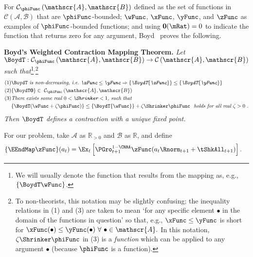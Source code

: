 \documentclass[BufferStockTheory]{subfiles}
\begin{document}
For $\mathcal{C}_{\phiFunc }\left( \mathscr{A},\mathscr{B}\right) $
defined as the set of functions in
$\mathcal{C}(\mathscr{A},\mathscr{B})$ that are $\phiFunc$-bounded;
$\wFunc$, $\xFunc$, $\yFunc$, and $\zFunc$ as examples of
$\phiFunc$-bounded functions; and using $\mathbf{0}(\mRat)=0$ to
indicate the function that returns zero for any argument,
Boyd~\citeyearpar{jboydWeighted} proves the following.

\textbf{Boyd's Weighted Contraction Mapping Theorem.} \textit{Let $\BoydT:\mathcal{C}_{\phiFunc }\left( \mathscr{A},\mathscr{B}\right)
  \rightarrow \mathcal{C}\left( \mathscr{A},\mathscr{B}\right) $ such
  that}\footnote{We will usually denote the function that results from the mapping as, e.g., $\{\BoydT\wFunc\}$.}$^,$\footnote{To non-theorists, this notation may be slightly confusing; the inequality relations in (1) and (3) are taken to mean `for any specific element $\bullet$ in the domain of the functions in question' so that, e.g., $\xFunc \leq \yFunc$ is short for $\xFunc(\bullet) \leq \yFunc(\bullet)~\forall~\bullet\in \mathscr{A}.$  In this notation, $\zeta \Shrinker \phiFunc$ in (3) is a {\it function} which can be applied to any argument $\bullet$ (because $\phiFunc$ is a function).} \nopagebreak
\begin{align*}
  \mbox{(1)} &\BoydT%
               \mbox{ {\it is non-decreasing, i.e.\ ${\xFunc} \leq {\yFunc}\Rightarrow
               \{\BoydT{\xFunc}\} \leq \{\BoydT{\yFunc}\}$}}   \nonumber \\
  \mbox{(2)} & \{\BoydT\mathbf{0}\}\in ~ \mathcal{C}_{\phiFunc }\left(\mathscr{A},\mathscr{B}\right)  \notag \\
  \mbox{(3)}
             & \mbox{\it There exists some real $0 < \Shrinker < 1$, such that} \\
             & \{\BoydT({\wFunc} +\zeta\phiFunc )\} \leq \{\BoydT{\wFunc}\} +\zeta\Shrinker \phiFunc
               \mbox{ {\it ~holds for all real $\zeta > 0$} }.
\end{align*}%
\textit{Then $\BoydT$ defines a contraction with a unique fixed point.}

For our problem, take $\mathscr{A}$ as $\mathbb{R}_{>0}$ and $\mathscr{B}$
as $\mathbb{R}$, and define
\begin{align*}
  \{\EEndMap \zFunc\}(a_{t})  & = \Ex_{t}\left[\PGro^{1-\CRRA}_{t+1} \zFunc(a_{t} \Rnorm_{t+1} + \tShkAll_{t+1})\right].
\end{align*}
\end{document}
